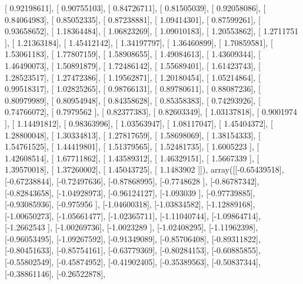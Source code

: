 \documentclass{article}
\begin{document}
       [ 0.92198611],
       [ 0.90755103],
       [ 0.84726711],
       [ 0.81505039],
       [ 0.92058086],
       [ 0.84064983],
       [ 0.85052335],
       [ 0.87238881],
       [ 1.09414301],
       [ 0.87599261],
       [ 0.93658652],
       [ 1.18364484],
       [ 1.06823269],
       [ 1.09010183],
       [ 1.20553862],
       [ 1.2711751 ],
       [ 1.21363184],
       [ 1.45412142],
       [ 1.34197797],
       [ 1.36460899],
       [ 1.70859581],
       [ 1.53061183],
       [ 1.77807159],
       [ 1.58908655],
       [ 1.49084613],
       [ 1.43609344],
       [ 1.46490073],
       [ 1.50891879],
       [ 1.72486142],
       [ 1.55689401],
       [ 1.61423743],
       [ 1.28523517],
       [ 1.27472386],
       [ 1.19562871],
       [ 1.20180454],
       [ 1.05214864],
       [ 0.99518317],
       [ 1.02825265],
       [ 0.98766131],
       [ 0.89780611],
       [ 0.88087236],
       [ 0.80979989],
       [ 0.80954948],
       [ 0.84358628],
       [ 0.85358383],
       [ 0.74293926],
       [ 0.74766072],
       [ 0.7979562 ],
       [ 0.82377383],
       [ 0.82603349],
       [ 1.03137818],
       [ 0.9001974 ],
       [ 1.14491812],
       [ 0.98363996],
       [ 1.03563947],
       [ 1.08117047],
       [ 1.45404372],
       [ 1.28800048],
       [ 1.30334813],
       [ 1.27817659],
       [ 1.58698069],
       [ 1.38154333],
       [ 1.54761525],
       [ 1.44419801],
       [ 1.51379565],
       [ 1.52481735],
       [ 1.6005223 ],
       [ 1.42608514],
       [ 1.67711862],
       [ 1.43589312],
       [ 1.46329151],
       [ 1.5667339 ],
       [ 1.39570018],
       [ 1.37260002],
       [ 1.45043725],
       [ 1.1483902 ]]), array([[-0.65439518],
       [-0.67238844],
       [-0.72497636],
       [-0.87868995],
       [-0.7748628 ],
       [-0.86787342],
       [-0.82843658],
       [-1.04928973],
       [-0.96124127],
       [-1.093039  ],
       [-0.97739885],
       [-0.93085936],
       [-0.975956  ],
       [-1.04600318],
       [-1.03834582],
       [-1.12889168],
       [-1.00650273],
       [-1.05661477],
       [-1.02365711],
       [-1.11040744],
       [-1.09864714],
       [-1.2662543 ],
       [-1.00269736],
       [-1.0023289 ],
       [-1.02408295],
       [-1.11962398],
       [-0.96053495],
       [-1.09267592],
       [-0.91349089],
       [-0.85706408],
       [-0.89311822],
       [-0.80451633],
       [-0.85754161],
       [-0.63779369],
       [-0.80284153],
       [-0.60885855],
       [-0.55802549],
       [-0.45874952],
       [-0.41902405],
       [-0.35389563],
       [-0.50837344],
       [-0.38861146],
       [-0.26522878],
\end{document}
